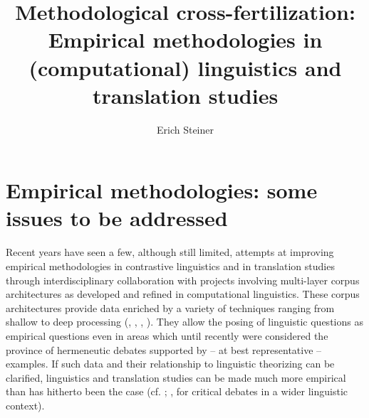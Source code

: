 \documentclass[output=paper]{LSP/langsci}
\author{Erich Steiner\affiliation{Universität des Saarlandes, Saarbrücken} 
}
\title{Methodological cross-fertilization: Empirical methodologies in (computational) linguistics and translation studies}
\begin{document}

\section{Empirical methodologies: some issues to be addressed}\label{sec:steiner:1}
\largerpage
Recent years have seen a few, although still limited, attempts at improving empirical methodologies in contrastive linguistics and in translation studies through interdisciplinary collaboration with projects involving multi-layer corpus architectures as developed and refined in computational linguistics. These corpus architectures provide data enriched by a variety of techniques ranging from shallow to deep processing (\citealt{VelaEtAl2007}, \citealt{ČuloEtAl2008}, \citealt{TeichEtAl2008}, \citealt{Teich2010}). They allow the posing of linguistic questions as empirical questions even in areas which until recently were considered the province of hermeneutic debates supported by -- at best representative -- examples. If such data and their relationship to linguistic theorizing can be clarified, linguistics and translation studies can be made much more empirical than has hitherto been the case (cf. \citealt{Featherstone2009}; \citealt{ZfS2009}, \citealt{Hawkins2004} for critical debates in a wider linguistic context). 
\end{document}
